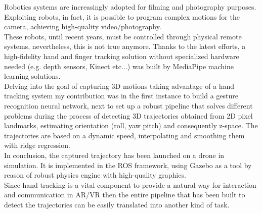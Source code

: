 Robotics systems are increasingly adopted for filming and photography purposes. Exploiting robots, in fact, it is possible to program complex motions for the camera, achieving high-quality video/photography. \\ 

\noindent These robots, until recent years, must be controlled through physical remote systems, nevertheless, this is not true anymore. Thanks to the latest efforts, a high-fidelity hand and finger tracking solution without specialized hardware needed (e.g. depth sensors, Kinect etc...) was built by MediaPipe machine learning solutions. \\

\noindent Delving into the goal of capturing 3D motions taking advantage of a hand tracking system my contribution was in the first instance to build a gesture recognition neural network, next to set up a robust pipeline that solves different problems during the process of detecting 3D trajectories obtained from 2D pixel landmarks, estimating orientation (roll, yaw pitch) and consequently z-space. The trajectories are based on a dynamic speed, interpolating and smoothing them with ridge regression. \\

\noindent In conclusion, the captured trajectory has been launched on a drone in simulation. It is implemented in the ROS framework, using Gazebo as a tool by reason of robust physics engine with high-quality graphics. \\

\noindent Since hand tracking is a vital component to provide a natural way for interaction and communication in AR/VR then the entire pipeline that has been built to detect the trajectories can be easily translated into another kind of task.
